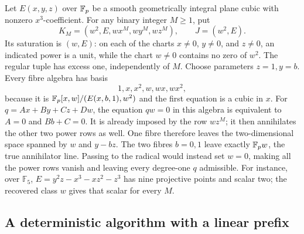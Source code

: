 \begin{example}
\label{sci:ex:slices}
Let \(E(x,y,z)\) over \(\mathbb F_p\) be a smooth geometrically integral plane cubic with
nonzero \(x^3\)-coefficient. For any binary integer \(M\geq1\), put
\[
 K_M=(w^2,E,wx^M,wy^M,wz^M),\qquad J=(w^2,E).
\]
Its saturation is \((w,E)\): on each of the charts \(x\ne0\),
\(y\ne0\), and \(z\ne0\), an indicated power is a unit, while
the chart \(w\ne0\) contains no zero of \(w^2\).
The regular tuple has excess one, independently of \(M\).
Choose parameters \(z=1,y=b\). Every fibre algebra has basis
\[
 1,x,x^2,w,wx,wx^2,
\]
because it is \(\mathbb F_p[x,w]/(E(x,b,1),w^2)\) and the first equation is
a cubic in \(x\). For
\(q=A x+B y+C z+D w\), the equation \(q w=0\) in this algebra is
equivalent to \(A=0\) and \(Bb+C=0\). It is already imposed by
the row \(wz^M\); it then annihilates the other two power rows as
well. One fibre therefore leaves the two-dimensional space spanned by
\(w\) and \(y-bz\). The two fibres \(b=0,1\) leave exactly
\(\mathbb F_p w\), the true annihilator line.
Passing to the radical would instead set \(w=0\), making all the
power rows vanish and leaving every degree-one \(q\) admissible.
For instance, over \(\mathbb F_5\),
\(E=y^2z-x^3-xz^2-z^3\) has nine projective points and scalar two;
the recovered class \(w\) gives that scalar for every \(M\).
\end{example}

\subsection{A deterministic algorithm with a linear prefix}


